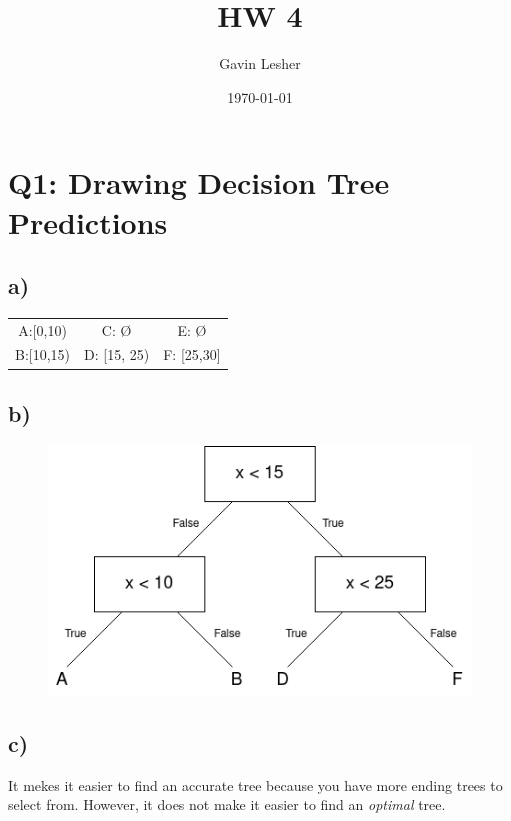 \documentclass{article}
\title{HW 4}
\author{Gavin Lesher}
\date{\today}
\begin{document}
    \maketitle
    \cleardoublepage
    \section*{Q1: Drawing Decision Tree Predictions}
        \subsection*{a)}
            \begin{tabular}{c c c}
                A:[0,10) & C: \O & E: \O \\
                B:[10,15) & D: [15, 25) & F: [25,30]
            \end{tabular}
        \subsection*{b)}
        \begin{figure}[h]
            \includegraphics[width=.5\textwidth]{"Q1_b.png"}
        \end{figure}
        \subsection*{c)}
            It mekes it easier to find an accurate tree because you have more ending trees to select from. However, it does not make it easier to find an \emph{optimal} tree.
\end{document}
